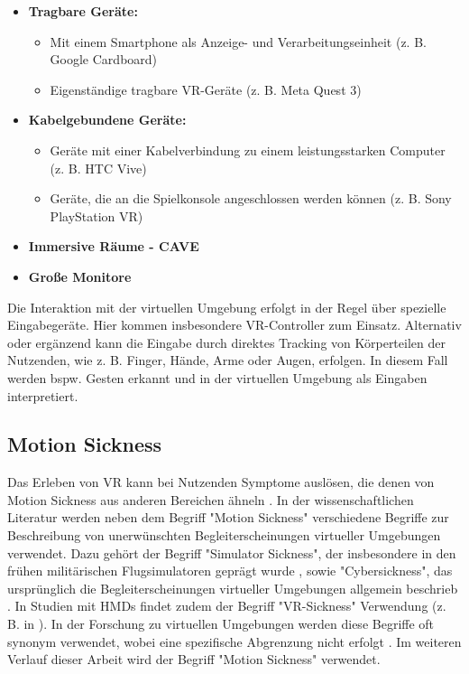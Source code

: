 \begin{itemize}
    \item \textbf{Tragbare Geräte:} 
    \begin{itemize}
        \item Mit einem Smartphone als Anzeige- und Verarbeitungseinheit (z. B.  Google Cardboard)
        \item Eigenständige tragbare VR-Geräte (z. B.  Meta Quest 3)
    \end{itemize}
    \item \textbf{Kabelgebundene Geräte:} 
    \begin{itemize}
        \item Geräte mit einer Kabelverbindung zu einem leistungsstarken Computer (z. B.  HTC Vive)
        \item Geräte, die an die Spielkonsole angeschlossen werden können (z. B.  Sony PlayStation VR)
    \end{itemize}
    \item \textbf{Immersive Räume - CAVE}
    \item \textbf{Große Monitore}
\end{itemize}

Die Interaktion mit der virtuellen Umgebung erfolgt in der Regel über spezielle Eingabegeräte. Hier kommen insbesondere VR-Controller zum Einsatz. Alternativ oder ergänzend kann die Eingabe durch direktes Tracking von Körperteilen der Nutzenden, wie z. B.  Finger, Hände, Arme oder Augen, erfolgen. In diesem Fall werden bspw. Gesten erkannt und in der virtuellen Umgebung als Eingaben interpretiert\citep{dorner_virtual_2019}.

\subsection{Motion Sickness}

Das Erleben von VR kann bei Nutzenden Symptome auslösen, die denen von Motion Sickness aus anderen Bereichen ähneln \citep{somrak_estimating_2019}. In der wissenschaftlichen Literatur werden neben dem Begriff "Motion Sickness" verschiedene Begriffe zur Beschreibung von unerwünschten Begleiterscheinungen virtueller Umgebungen verwendet. Dazu gehört der Begriff "Simulator Sickness", der insbesondere in den frühen militärischen Flugsimulatoren geprägt wurde \citep{kennedy_simulator_1993}, sowie "Cybersickness", das ursprünglich die Begleiterscheinungen virtueller Umgebungen allgemein beschrieb \citep{mccauley_cybersickness_1992}. In Studien mit HMDs findet zudem der Begriff "VR-Sickness" Verwendung (z. B.  in \citep{kim_virtual_2018}). In der Forschung zu virtuellen Umgebungen werden diese Begriffe oft synonym verwendet, wobei eine spezifische Abgrenzung nicht erfolgt \citep{saredakis_factors_2020}. Im weiteren Verlauf dieser Arbeit wird der Begriff "Motion Sickness" verwendet. 

